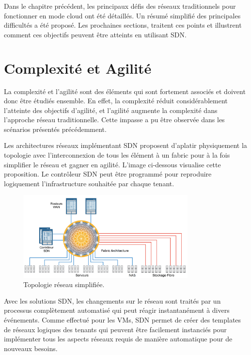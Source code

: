 Dans le chapitre précédent, les principaux défis des réseaux traditionnels pour fonctionner en mode cloud ont été détaillés. Un résumé simplifié des principales difficultés a été proposé. Les prochaines sections, traitent ces points et illustrent comment ces objectifs peuvent être atteints en utilisant SDN. \cite{realTimeCloudUseCases} 


\section{Complexité et Agilité}

La complexité et l'agilité sont des éléments qui sont fortement associés et doivent donc être étudiés ensemble. En effet, la complexité réduit considérablement l'atteinte des objectifs d'agilité, et l'agilité augmente la complexité dans l'approche réseau traditionnelle. Cette impasse a pu être observée dans les scénarios présentés précédemment. 

Les architectures réseaux implémentant SDN proposent d'aplatir physiquement la topologie avec l'interconnexion de tous les élément à un \gls{fabric} pour à la fois simplifier le réseau et gagner en agilité. L'image ci-dessous visualise cette proposition. Le contrôleur SDN peut être programmé pour reproduire logiquement l'infrastructure souhaitée par chaque tenant. 

\begin{figure}[h]
\begin{center}
\includegraphics[width=0.8\textwidth]{images/RefArchiSDN_T} 
\caption{Topologie réseau simplifiée. \cite{cloudReadyNetworkJuniper}} \label{RefArchiSDN}
\end{center}
\end{figure} 

Avec les solutions SDN, les changements sur le réseau sont traités par un processus complètement automatisé qui peut réagir instantanément à divers événements. Comme effectué pour les VMs, SDN permet de créer des templates de réseaux logiques des tenants qui peuvent être facilement instanciés pour implémenter tous les aspects réseaux requis de manière automatique pour de nouveaux besoins. 

